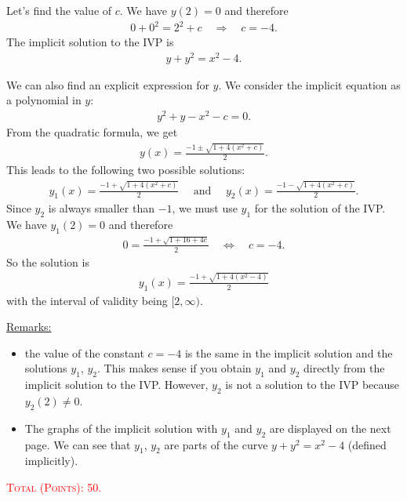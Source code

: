 \documentclass[12pt]{article}
\begin{document}
	Let's find the value of $c$. We have $y (2) = 0$ and therefore
		\begin{align*}
		0 + 0^2 = 2^2 + c \quad \Rightarrow \quad c = -4 .
		\end{align*}
	The implicit solution to the IVP is
		\begin{align*}
		y + y^2 = x^2 - 4 .
		\end{align*}
		
	We can also find an explicit expression for $y$. We consider the implicit equation as a polynomial in $y$:
		\begin{align*}
		y^2 + y - x^2 -c = 0 .
		\end{align*}
	From the quadratic formula, we get
		\begin{align*}
		y (x) = \frac{-1 \pm \sqrt{1 + 4(x^2 + c)}}{2} .
		\end{align*}
	This leads to the following two possible solutions:
		\begin{align*}
		y_1 (x) = \frac{-1 + \sqrt{1 + 4 (x^2 + c)}}{2} \quad \text{ and } \quad y_2 (x) = \frac{-1 - \sqrt{1 + 4 (x^2 + c)}}{2} .
		\end{align*}
	Since $y_2$ is always smaller than $-1$, we must use $y_1$ for the solution of the IVP. We have $y_1 (2) = 0$ and therefore
		\begin{align*}
		0 = \frac{-1 + \sqrt{1 + 16 + 4c}}{2} \quad \iff \quad c = -4 .
		\end{align*}
	So the solution is
		\begin{align*}
		y_1 (x) = \frac{-1 + \sqrt{1 + 4 (x^2 - 4)}}{2}
		\end{align*}
	with the interval of validity being $[2, \infty )$. 
	
	\underline{Remarks:}
		\begin{itemize}
		\item the value of the constant $c = -4$ is the same in the implicit solution and the solutions $y_1$, $y_2$. This makes sense if you obtain $y_1$ and $y_2$ directly from the implicit solution to the IVP. However, $y_2$ is not a solution to the IVP because $y_2 (2) \neq 0$.
		\item The graphs of the implicit solution with $y_1$ and $y_2$ are displayed on the next page. We can see that $y_1$, $y_2$ are parts of the curve $y + y^2 = x^2 - 4$ (defined implicitly).
		\end{itemize}
	
	
		
	\vfill
	
	\hfill \textcolor{red}{\textsc{Total (Points): 50.}}
	
\end{document}
